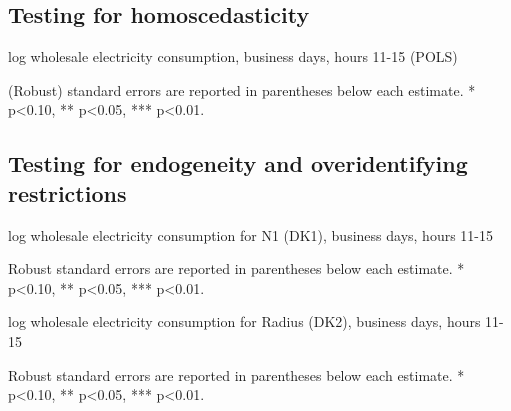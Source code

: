\subsection{Testing for homoscedasticity}
\label{app:homoscedasticity}
\begin{table}[H]
\centering
\begin{threeparttable}
  \caption{log wholesale electricity consumption, business days, hours 11-15 (POLS)}
  \label{tab:ws_homoscedasticity}
  \footnotesize
    
    \begin{tablenotes}
    \item (Robust) standard errors are reported in parentheses below each estimate. * p<0.10, ** p<0.05, *** p<0.01.
  \end{tablenotes}
\end{threeparttable}
\end{table}

\clearpage

\subsection{Testing for endogeneity and overidentifying restrictions}
\label{app:endog_overid}
\begin{table}[H]
\centering
\begin{threeparttable}
  \caption{log wholesale electricity consumption for N1 (DK1), business days, hours 11-15}
  \label{tab:ws_endog_overid_131}
  \footnotesize
    
    \begin{tablenotes}
    \item Robust standard errors are reported in parentheses below each estimate. * p<0.10, ** p<0.05, *** p<0.01.
  \end{tablenotes}
\end{threeparttable}
\end{table}
\begin{table}[H]
\centering
\begin{threeparttable}
  \caption{log wholesale electricity consumption for Radius (DK2), business days, hours 11-15}
  \label{tab:ws_endog_overid_791}
  \footnotesize
    
    \begin{tablenotes}
    \item Robust standard errors are reported in parentheses below each estimate. * p<0.10, ** p<0.05, *** p<0.01.
  \end{tablenotes}
\end{threeparttable}
\end{table}
